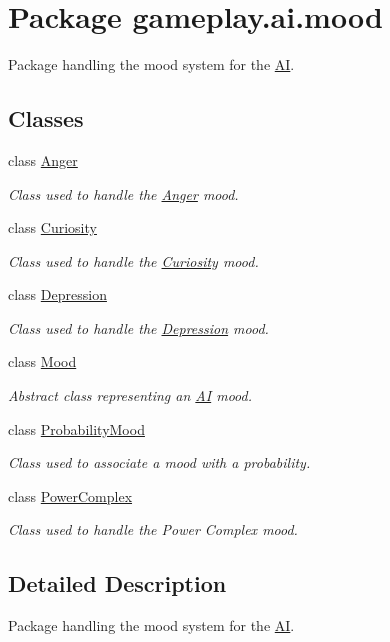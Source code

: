 \hypertarget{a00083}{\section{Package gameplay.\-ai.\-mood}
\label{a00083}
}


Package handling the mood system for the \hyperlink{a00001}{A\-I}.  


\subsection*{Classes}
\begin{DoxyCompactItemize}
\item 
class \hyperlink{a00003}{Anger}
\begin{DoxyCompactList}\small\item\em Class used to handle the \hyperlink{a00003}{Anger} mood. \end{DoxyCompactList}\item 
class \hyperlink{a00007}{Curiosity}
\begin{DoxyCompactList}\small\item\em Class used to handle the \hyperlink{a00007}{Curiosity} mood. \end{DoxyCompactList}\item 
class \hyperlink{a00008}{Depression}
\begin{DoxyCompactList}\small\item\em Class used to handle the \hyperlink{a00008}{Depression} mood. \end{DoxyCompactList}\item 
class \hyperlink{a00015}{Mood}
\begin{DoxyCompactList}\small\item\em Abstract class representing an \hyperlink{a00001}{A\-I} mood. \end{DoxyCompactList}\item 
class \hyperlink{a00021}{Probability\-Mood}
\begin{DoxyCompactList}\small\item\em Class used to associate a mood with a probability. \end{DoxyCompactList}\item 
class \hyperlink{a00020}{Power\-Complex}
\begin{DoxyCompactList}\small\item\em Class used to handle the Power Complex mood. \end{DoxyCompactList}\end{DoxyCompactItemize}


\subsection{Detailed Description}
Package handling the mood system for the \hyperlink{a00001}{A\-I}. 